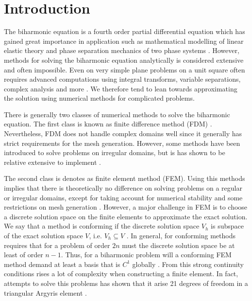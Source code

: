 \section{Introduction}\label{sec:introduction}


The biharmonic equation is a fourth order partial differential equation which has gained great importance in
application such as mathematical modelling of linear elastic theory \cite{selvadurai13} and phase separation mechanics
of two phase systems \cite{cahnhilliard1957, kim16}. However, methods for solving the biharmonic equation analytically
is considered extensive and often impossible. Even on very simple plane problems on a unit square often requires advanced computations using integral transforms, variable separations, complex analysis and more \cite{selvadurai13}. We therefore tend
to lean towards approximating the solution using numerical methods for complicated problems.

There is generally two classes of numerical methods to solve the biharmonic equation. The first class is known as finite difference method (FDM) \cite{geer06,ehrlich75, hackbusch17}. Nevertheless, FDM does not handle complex domains well since it generally has strict requirements for the mesh generation. However, some methods have been introduced to solve problems on irregular domains, but is has shown to be relative extensive to implement \cite{hackbusch17, chen08, belyaev18}.

The second class is denotes as finite element method (FEM). Using this methods implies that there is theoretically no difference on solving problems on a regular or irregular domains, except for taking account for numerical stability and some
restrictions on mesh generation \cite{chen08}. However, a major challenge in FEM is to choose a discrete solution space on the finite elements to approximate the exact solution. We say that a method is conforming if the discrete solution space
$V_{h}$ is subspace of the exact solution space $V$, i.e. $V_{h} \subseteq  V$ \cite{shi02, brenner07math}. In general, for conforming methods requires that for a problem of order $2n$ must the discrete solution space be at least of order $n-1$. Thus, for a biharmonic problem
will a conforming FEM method demand at least a basis that is $C^1$ globally \cite{shi02}. From this strong continuity conditions rises a lot of complexity when constructing a finite element. In fact, attempts to solve this problems has shown that it
arise 21 degrees of freedom in a triangular Argyris element \cite{nair21}.

